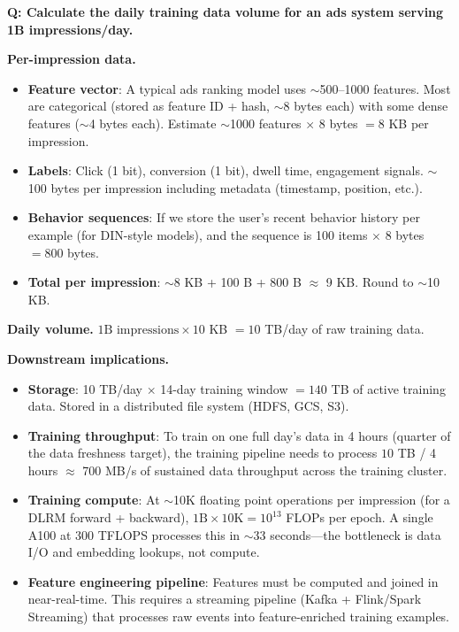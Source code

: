 \begin{interviewq}
\textbf{Q: Calculate the daily training data volume for an ads system serving 1B impressions/day.}

 \quad {} \quad \badgefreq{\freqlow}

\stronganswer

\textbf{Per-impression data.}
\begin{itemize}
    \item \textbf{Feature vector}: A typical ads ranking model uses $\sim$500--1000 features. Most are categorical (stored as feature ID + hash, $\sim$8 bytes each) with some dense features ($\sim$4 bytes each). Estimate $\sim$1000 features $\times$ 8 bytes $= 8$ KB per impression.
    \item \textbf{Labels}: Click (1 bit), conversion (1 bit), dwell time, engagement signals. $\sim$100 bytes per impression including metadata (timestamp, position, etc.).
    \item \textbf{Behavior sequences}: If we store the user's recent behavior history per example (for DIN-style models), and the sequence is 100 items $\times$ 8 bytes $= 800$ bytes.
    \item \textbf{Total per impression}: $\sim$8 KB + 100 B + 800 B $\approx$ 9 KB. Round to $\sim$10 KB.
\end{itemize}

\textbf{Daily volume.} $1\text{B impressions} \times 10$ KB $= 10$ TB/day of raw training data.

\textbf{Downstream implications.}
\begin{itemize}
    \item \textbf{Storage}: 10 TB/day $\times$ 14-day training window $= 140$ TB of active training data. Stored in a distributed file system (HDFS, GCS, S3).
    \item \textbf{Training throughput}: To train on one full day's data in 4 hours (quarter of the data freshness target), the training pipeline needs to process $10$ TB / 4 hours $\approx$ 700 MB/s of sustained data throughput across the training cluster.
    \item \textbf{Training compute}: At $\sim$10K floating point operations per impression (for a DLRM forward + backward), $1\text{B} \times 10\text{K} = 10^{13}$ FLOPs per epoch. A single A100 at 300 TFLOPS processes this in $\sim$33 seconds---the bottleneck is data I/O and embedding lookups, not compute.
    \item \textbf{Feature engineering pipeline}: Features must be computed and joined in near-real-time. This requires a streaming pipeline (Kafka + Flink/Spark Streaming) that processes raw events into feature-enriched training examples.
\end{itemize}


\end{interviewq}
